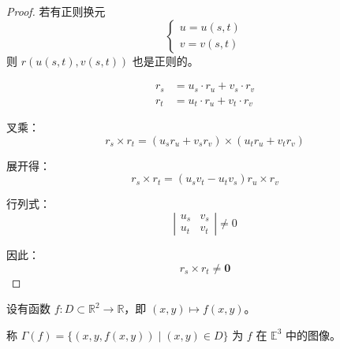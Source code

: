 \documentclass[lang=cn,10pt,thmcnt=section]{elegantbook}
\renewcommand{\vec}[1]{\mathbf{#1}}
\begin{document}
\begin{proof}
        若有正则换元
    $$
    \begin{cases}
    u = u(s, t) \\
    v = v(s, t)
    \end{cases}
    $$
    则 $r(u(s,t), v(s,t))$ 也是正则的。
    
    $$
    \begin{aligned}
    r_s &= u_s \cdot r_u + v_s \cdot r_v \\
    r_t &= u_t \cdot r_u + v_t \cdot r_v
    \end{aligned}
    $$
    
    叉乘：
    $$
    r_s \times r_t = (u_s r_u + v_s r_v) \times (u_t r_u + v_t r_v)
    $$
    
    展开得：
    $$
    r_s \times r_t = (u_s v_t - u_t v_s) r_u \times r_v
    $$
    
    行列式：
    $$
    \left| \begin{matrix} u_s & v_s \\ u_t & v_t \end{matrix} \right| \neq 0
    $$
    
    因此：
    $$
    r_s \times r_t \neq \vec{0}
    $$
\end{proof} 
\begin{definition}[图像]
    设有函数 $f: D \subset \mathbb{R}^2 \rightarrow \mathbb{R}$，即 $(x, y) \mapsto f(x, y)$。
    
    称 $\Gamma(f) = \{(x, y, f(x, y)) \mid (x, y) \in D\}$ 为 $f$ 在 $\mathbb{E}^3$ 中的图像。
\end{definition}
    
\end{document}
